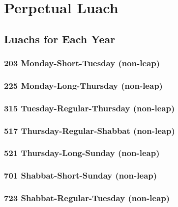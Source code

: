 \part{Perpetual Luach}





\chapter{Luachs for Each Year}
\togglefalse{leapyear}
\section{203 Monday-Short-Tuesday (non-leap)}
\label{702}
\tishreiMon

\section{225 Monday-Long-Thursday (non-leap)}
\label{225}
\tishreiMon

\section{315 Tuesday-Regular-Thursday (non-leap)}
\label{315}
\tishreiTues

\section{517 Thursday-Regular-Shabbat (non-leap)}
\label{517}
\tishreiThurs

\section{521 Thursday-Long-Sunday (non-leap)}
\label{521}
\tishreiThurs

\section{701 Shabbat-Short-Sunday (non-leap)}
\label{701}
\tishreiShab
{}
\kislevTues

\section{723 Shabbat-Regular-Tuesday (non-leap)}
\label{723}
\tishreiShab
{}

